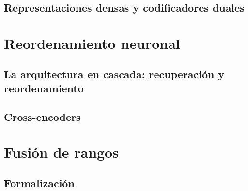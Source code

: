 \subsection{Representaciones densas y codificadores duales}\label{subsec:marco-densos}

\section{Reordenamiento neuronal}\label{sec:marco-reranking}

\subsection{La arquitectura en cascada: recuperación y reordenamiento}\label{subsec:marco-cascada}

\subsection{Cross-encoders}\label{subsec:marco-crossencoders}

\section{Fusión de rangos}\label{sec:marco-fusion}

\subsection{Formalización}\label{subsec:marco-fusion-formal}

